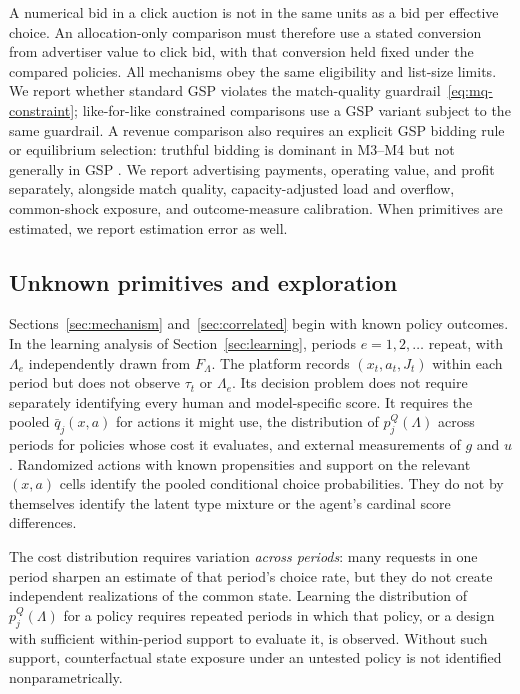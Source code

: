 \documentclass[opre,dblanonrev]{informs4}
\providecommand{\1}{\mathbf{1}}
\begin{document}
A numerical bid in a click auction is not in the same units as a bid per effective choice. An allocation-only comparison must therefore use a stated conversion from advertiser value to click bid, with that conversion held fixed under the compared policies. All mechanisms obey the same eligibility and list-size limits. We report whether standard GSP violates the match-quality guardrail~\eqref{eq:mq-constraint}; like-for-like constrained comparisons use a GSP variant subject to the same guardrail. A revenue comparison also requires an explicit GSP bidding rule or equilibrium selection: truthful bidding is dominant in M3--M4 but not generally in GSP \citep{edelman2007internet}. We report advertising payments, operating value, and profit separately, alongside match quality, capacity-adjusted load and overflow, common-shock exposure, and outcome-measure calibration. When primitives are estimated, we report estimation error as well.

\subsection{Unknown primitives and exploration}\label{sec:model-learning}

Sections~\ref{sec:mechanism} and~\ref{sec:correlated} begin with known policy outcomes. In the learning analysis of Section~\ref{sec:learning}, periods $e=1,2,\ldots$ repeat, with $\Lambda_e$ independently drawn from $F_\Lambda$. The platform records $(x_t,a_t,J_t)$ within each period but does not observe $\tau_t$ or $\Lambda_e$. Its decision problem does not require separately identifying every human and model-specific score. It requires the pooled $\bar q_j(x,a)$ for actions it might use, the distribution of $p_j^Q(\Lambda)$ across periods for policies whose cost it evaluates, and external measurements of $g$ and $u$. Randomized actions with known propensities and support on the relevant $(x,a)$ cells identify the pooled conditional choice probabilities. They do not by themselves identify the latent type mixture or the agent's cardinal score differences.

The cost distribution requires variation \emph{across periods}: many requests in one period sharpen an estimate of that period's choice rate, but they do not create independent realizations of the common state. Learning the distribution of $p_j^Q(\Lambda)$ for a policy requires repeated periods in which that policy, or a design with sufficient within-period support to evaluate it, is observed. Without such support, counterfactual state exposure under an untested policy is not identified nonparametrically.
\end{document}
